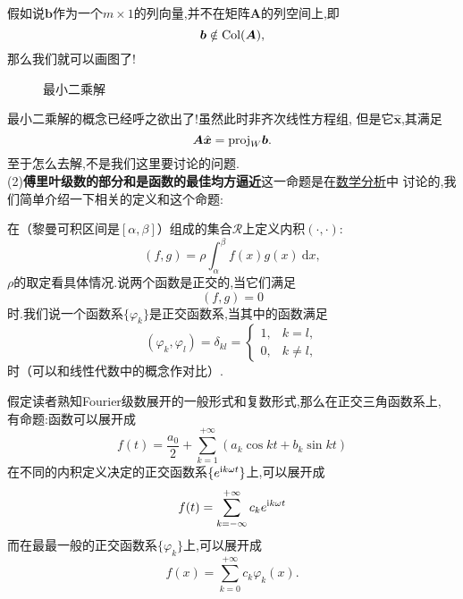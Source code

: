 \documentclass[cn,10pt,citestyle=gb7714-2015,bibstyle=gb7714-2015]{elegantbook}
\renewcommand{\emph}[1]{\textbf{#1}}%
\newcommand{\md}{\ \mathrm{d}}
\begin{document}
假如说$\bm{b}$作为一个$m\times 1$的列向量,并不在矩阵$\bm{A}$的列空间上,即
\[
    \bm{b}\notin \textup{Col}(\bm{A}),  
\]
那么我们就可以画图了!
\begin{figure}[H]
    \centering
    \caption{最小二乘解}
\end{figure}
最小二乘解的概念已经呼之欲出了!虽然此时非齐次线性方程组,
但是它$\hat{\bm{x}}$,其满足
\[
    \bm{A}\hat{\bm{x}}=\textup{proj}_{W}\bm{b}.
\]
至于怎么去解,不是我们这里要讨论的问题.\\
(2)\emph{傅里叶级数的部分和是函数的最佳均方逼近}这一命题是在\uline{数学分析}中
讨论的,我们简单介绍一下相关的定义和这个命题:
    \begin{definition}[正交函数系]
        在（黎曼可积区间是$[\alpha,\beta]$）组成的集合$\mathscr{R}$上定义内积$(\cdot,\cdot)$:
        \[
            (f,g)=\rho\int_\alpha^\beta f(x)g(x)\md x,  
        \]
        $\rho$的取定看具体情况.说两个函数是正交的,当它们满足
        \[
            (f,g)=0  
        \]
        时.我们说一个函数系$\{\varphi_k\}$是正交函数系,当其中的函数满足
        \[
            (\varphi_k,\varphi_l)=\delta_{kl}=\begin{cases}
                1,&k=l,\\
                0,&k\neq l,
            \end{cases}  
        \]
        时（可以和线性代数中的概念作对比）.
    \end{definition}
    \begin{definition}[正交函数系的傅里叶级数]
        假定读者熟知\textup{Fourier}级数展开的一般形式和复数形式,那么在正交三角函数系上,
        有命题:函数可以展开成
        \[
            f(t)=\frac{a_0}{2}+\sum_{k=1}^{+\infty}\left(a_k\cos kt+b_k\sin kt\right)
        \]
        在不同的内积定义决定的正交函数系$\{e^{\textup{i}k\omega t}\}$上,可以展开成
        \[
            f(t)=\sum_{k=-\infty}^{+\infty}c_k e^{\textup{i}k\omega t}  
        \]
        而在最最一般的正交函数系$\{\varphi_k\}$上,可以展开成
        \[
            f(x)=\sum_{k=0}^{+\infty}c_k\varphi_k(x).
        \]
    \end{definition}
\end{document}
